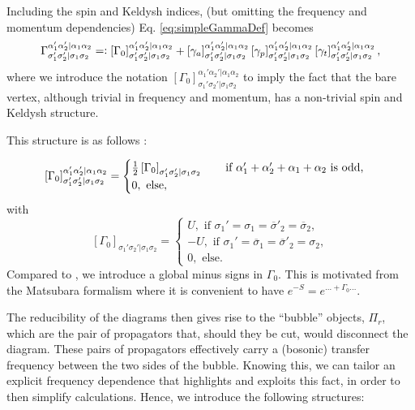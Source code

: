 \documentclass[12pt,a4paper,roman]{article}
\newcommand{\eqdef}{=\vcentcolon}
\begin{document}
Including the spin and Keldysh indices, (but omitting the frequency and momentum dependencies) Eq. \eqref{eq:simpleGammaDef} becomes
\begin{equation}
	\Gamma_{\sigma_1'\sigma_2'|\sigma_1\sigma_2}^{\alpha_1'\alpha_2'|\alpha_1\alpha_2} \eqdef \left[\Gamma_0 \right]_{\sigma_1'\sigma_2'|\sigma_1\sigma_2}^{\alpha_1'\alpha_2'|\alpha_1\alpha_2} + \left[\gamma_a \right]_{\sigma_1'\sigma_2'|\sigma_1\sigma_2}^{\alpha_1'\alpha_2'|\alpha_1\alpha_2}\left[\gamma_p \right]_{\sigma_1'\sigma_2'|\sigma_1\sigma_2}^{\alpha_1'\alpha_2'|\alpha_1\alpha_2}\left[\gamma_t \right]_{\sigma_1'\sigma_2'|\sigma_1\sigma_2}^{\alpha_1'\alpha_2'|\alpha_1\alpha_2},
\end{equation}
where we introduce the notation $\left[\Gamma_0 \right]_{\sigma_1'\sigma_2'|\sigma_1\sigma_2}^{\alpha_1'\alpha_2'|\alpha_1\alpha_2}$ to imply the fact that the bare vertex, although trivial in frequency and momentum, has a non-trivial spin and Keldysh structure.

This structure is as follows \cite{PhysRevB.81.195109}:

\begin{equation}
	\left[\Gamma_0 \right]_{\sigma_1'\sigma_2'|\sigma_1\sigma_2}^{\alpha_1'\alpha_2'|\alpha_1\alpha_2} = \begin{cases}
	\frac{1}{2} \left[\Gamma_0 \right]_{\sigma_1'\sigma_2'|\sigma_1\sigma_2} \hspace{0.7cm}\text{if } \alpha_1'+\alpha_2' + \alpha_1+\alpha_2 \text{ is odd,} \\
	0, \text{ else,}
	\end{cases}
	\label{eq:defGamma0withKeldysh}
\end{equation}
with 
\begin{equation}
\left[\Gamma_0 \right]_{\sigma_1'\sigma_2'|\sigma_1\sigma_2} = \begin{cases}
U, \text{ if } \sigma_1'=\sigma_1= \overline{\sigma}'_2=\overline{\sigma}_2, \\
-U, \text{ if } \sigma_1'=\overline{\sigma}_1= \overline{\sigma}'_2=\sigma_2, \\
0, \text{ else.}
\end{cases}
\label{eq:defGamma0withourKeldysh}
\end{equation}
Compared to \cite{PhysRevB.81.195109}, we introduce a global minus signs in $\Gamma_0$.
This is motivated from the Matsubara formalism where it is convenient to have
$e^{-S} = e^{ \ldots + \Gamma_0 \ldots }$.

The reducibility of the diagrams then gives rise to the ``bubble'' objects, $\Pi_r$, which are the pair of propagators that, should they be cut, would disconnect the diagram. These pairs of propagators effectively carry a (bosonic) transfer frequency between the two sides of the bubble. Knowing this, we can tailor an explicit frequency dependence that highlights and exploits this fact, in order to then simplify calculations. Hence, we introduce the following structures:
\end{document}
